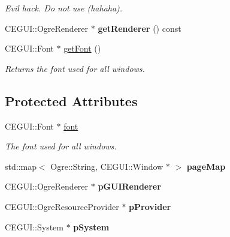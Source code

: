 \begin{DoxyCompactItemize}
\begin{DoxyCompactList}\small\item\em \-Evil hack. \-Do not use (hahaha). \end{DoxyCompactList}\item 
\hypertarget{classWindowManager_a8bce37506025f417955a2cff1431a651}{
\-C\-E\-G\-U\-I\-::\-Ogre\-Renderer $\ast$ {\bfseries get\-Renderer} () const }
\label{d9/d6e/classWindowManager_a8bce37506025f417955a2cff1431a651}

\item 
\hypertarget{classWindowManager_a45024db1a31699bcdd23c30bf9dcd75d}{
\-C\-E\-G\-U\-I\-::\-Font $\ast$ \hyperlink{classWindowManager_a45024db1a31699bcdd23c30bf9dcd75d}{get\-Font} ()}
\label{d9/d6e/classWindowManager_a45024db1a31699bcdd23c30bf9dcd75d}

\begin{DoxyCompactList}\small\item\em \-Returns the font used for all windows. \end{DoxyCompactList}\end{DoxyCompactItemize}
\subsection*{\-Protected \-Attributes}
\begin{DoxyCompactItemize}
\item 
\hypertarget{classWindowManager_ac2178fa5e70017df7166f7f959d64847}{
\-C\-E\-G\-U\-I\-::\-Font $\ast$ \hyperlink{classWindowManager_ac2178fa5e70017df7166f7f959d64847}{font}}
\label{d9/d6e/classWindowManager_ac2178fa5e70017df7166f7f959d64847}

\begin{DoxyCompactList}\small\item\em \-The font used for all windows. \end{DoxyCompactList}\item 
\hypertarget{classWindowManager_a61f0b5ea1707c0cef78ec79a19b05e13}{
std\-::map$<$ \-Ogre\-::\-String, \*
\-C\-E\-G\-U\-I\-::\-Window $\ast$ $>$ {\bfseries page\-Map}}
\label{d9/d6e/classWindowManager_a61f0b5ea1707c0cef78ec79a19b05e13}

\item 
\hypertarget{classWindowManager_a32a398cc03072cec9b53cc2fc9f4ac52}{
\-C\-E\-G\-U\-I\-::\-Ogre\-Renderer $\ast$ {\bfseries p\-G\-U\-I\-Renderer}}
\label{d9/d6e/classWindowManager_a32a398cc03072cec9b53cc2fc9f4ac52}

\item 
\hypertarget{classWindowManager_a5f75ea8180199a00704ecef1111b3593}{
\-C\-E\-G\-U\-I\-::\-Ogre\-Resource\-Provider $\ast$ {\bfseries p\-Provider}}
\label{d9/d6e/classWindowManager_a5f75ea8180199a00704ecef1111b3593}

\item 
\hypertarget{classWindowManager_a4d2fd3e495a1c0fd7a32256fd3c924e4}{
\-C\-E\-G\-U\-I\-::\-System $\ast$ {\bfseries p\-System}}
\label{d9/d6e/classWindowManager_a4d2fd3e495a1c0fd7a32256fd3c924e4}

\end{DoxyCompactItemize}
